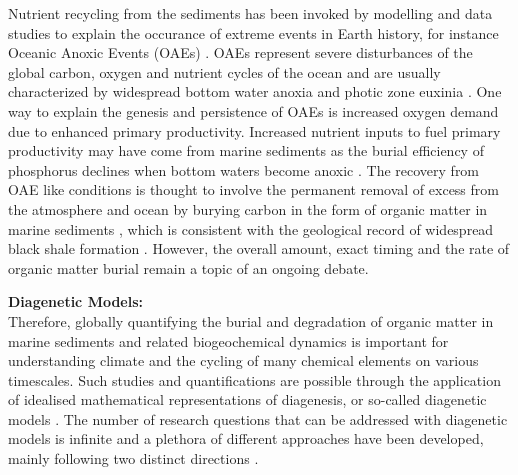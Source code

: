 \documentclass[gmd, manuscript]{copernicus}
\begin{document}
Nutrient recycling from the sediments has been invoked by modelling and data studies to explain the occurance of extreme events in Earth history, for instance Oceanic Anoxic Events (OAEs) 
\citep[e.g.][]{mort_phosphorus_2007, tsandev_modeling_2009}. OAEs represent severe disturbances of the global carbon, oxygen and nutrient cycles of the ocean and are usually characterized 
by widespread bottom water anoxia and photic zone euxinia \citep{jenkyns_geochemistry_2010}. 
One way to explain the genesis and persistence of OAEs is increased oxygen demand due to enhanced primary productivity. Increased nutrient inputs to fuel primary productivity may have come from marine sediments as the 
burial efficiency of phosphorus declines when bottom waters become anoxic \citep{ingall_evidence_1994, van_cappellen_benthic_1994}. 
The recovery from OAE like conditions is thought to involve the permanent removal of excess  from the atmosphere and ocean by burying carbon in the form of organic matter in marine sediments 
\citep[e.g.][]{arthur_geochemical_1988, jarvis_black_2011}, which is consistent with the geological record of widespread black shale formation \citep{stein_accumulation_1986}. 
However, the overall amount, exact timing and the rate of organic matter burial remain a topic of an ongoing debate. 


\textbf{Diagenetic Models:}\\
Therefore, globally quantifying the burial and degradation of organic matter in marine sediments and related biogeochemical dynamics is important for understanding 
climate and the cycling of many chemical elements on various timescales. Such studies and quantifications are possible through the application of idealised 
mathematical representations of diagenesis, or so-called diagenetic models \citep[see e.g.][]{berner_early_1980, boudreau1997diagenetic}.
The number of research questions that can be addressed with diagenetic models is infinite and a plethora of different approaches have been developed, mainly 
following two distinct directions \citep{arndt_quantifying_2013}. 
\end{document}
